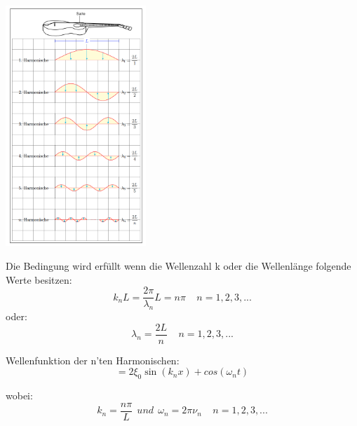 \documentclass[7pt]{article}
\begin{document}
\begin{multicols*}{3}
\begin{center}
	\includegraphics[width=150pt]{images/harmonische_saite.png}
\end{center}

\columnbreak

Die Bedingung wird erf{\"u}llt wenn die Wellenzahl k oder die Wellenl{\"a}nge folgende Werte besitzen:
\newline
\begin{equation*}
k_n L = \frac{2\pi}{\lambda _n}L = n\pi  \>\>\>\>\> n=1,2,3,...
\end{equation*}
oder:
\begin{equation*}
\lambda _n = \frac{2L}{n}  \>\>\>\>\> n=1,2,3,...
\end{equation*}


Wellenfunktion der n'ten Harmonischen:
\begin{equation*}
= 2 \xi _0 \sin(k_n x) + cos(\omega _n t)
\end{equation*}

wobei:
\begin{equation*}
k_n = \frac{n\pi}{L} \>\> und \>\> \omega _n = 2\pi \nu _n \>\>\>\>\> n=1,2,3,...
\end{equation*}

\end{multicols*}
\end{document}
